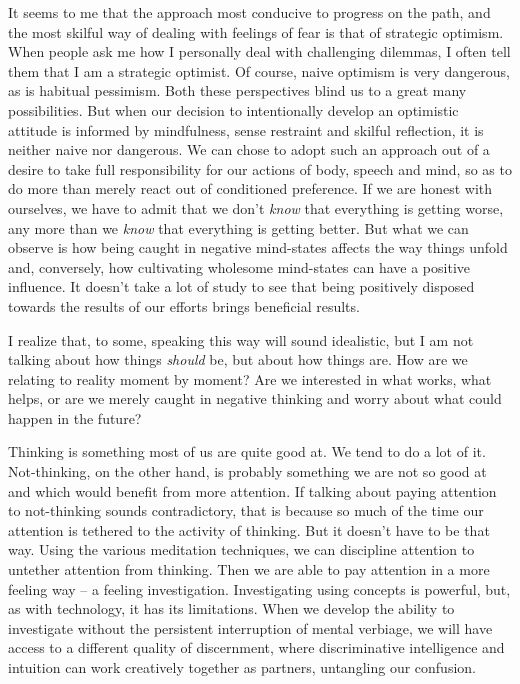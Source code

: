 It seems to me that the approach most conducive to progress on the path,
and the most skilful way of dealing with feelings of fear is that of
strategic optimism. When people ask me how I personally deal with
challenging dilemmas, I often tell them that I am a strategic optimist.
Of course, naive optimism is very dangerous, as is habitual pessimism.
Both these perspectives blind us to a great many possibilities. But when
our decision to intentionally develop an optimistic attitude is informed
by mindfulness, sense restraint and skilful reflection, it is neither
naive nor dangerous. We can chose to adopt such an approach out of a
desire to take full responsibility for our actions of body, speech and
mind, so as to do more than merely react out of conditioned preference.
If we are honest with ourselves, we have to admit that we don't
\emph{know} that everything is getting worse, any more than we
\emph{know} that everything is getting better. But what we can observe
is how being caught in negative mind-states affects the way things
unfold and, conversely, how cultivating wholesome mind-states can have a
positive influence. It doesn't take a lot of study to see that being
positively disposed towards the results of our efforts brings beneficial
results.

I realize that, to some, speaking this way will sound idealistic, but I
am not talking about how things \emph{should} be, but about how things
are. How are we relating to reality moment by moment? Are we interested
in what works, what helps, or are we merely caught in negative thinking
and worry about what could happen in the future?

Thinking is something most of us are quite good at. We tend to do a lot
of it. Not-thinking, on the other hand, is probably something we are not
so good at and which would benefit from more attention. If talking about
paying attention to not-thinking sounds contradictory, that is because
so much of the time our attention is tethered to the activity of
thinking. But it doesn't have to be that way. Using the various
meditation techniques, we can discipline attention to untether attention
from thinking. Then we are able to pay attention in a more feeling way
-- a feeling investigation. Investigating using concepts is powerful,
but, as with technology, it has its limitations. When we develop the
ability to investigate without the persistent interruption of mental
verbiage, we will have access to a different quality of discernment,
where discriminative intelligence and intuition can work creatively
together as partners, untangling our confusion.

